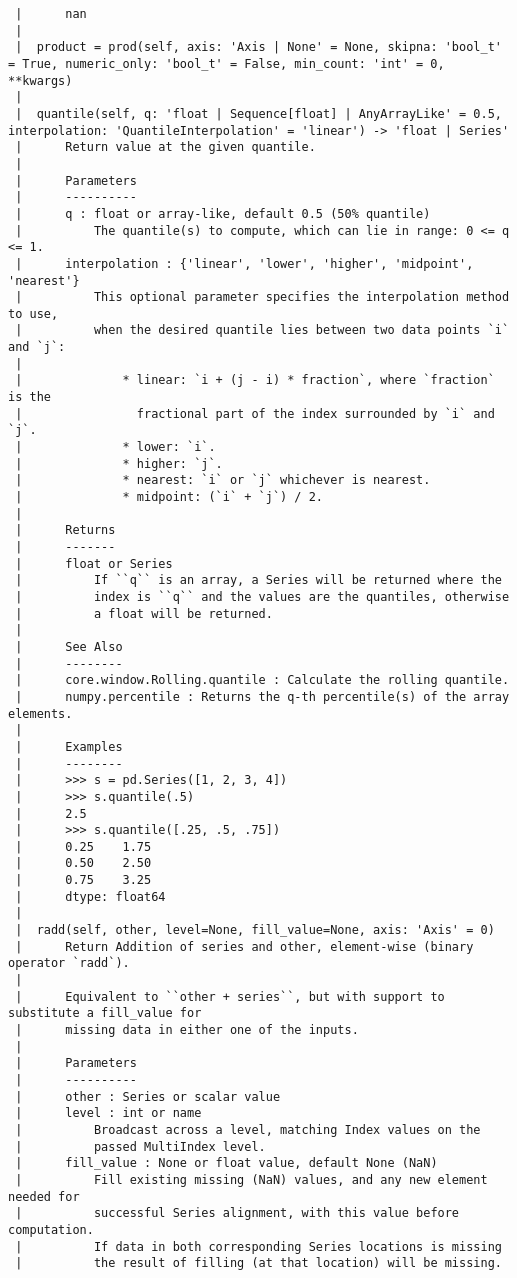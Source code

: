 \documentclass[
  letterpaper,
  DIV=11,
  numbers=noendperiod]{scrreprt}
\begin{document}
\begin{verbatim}
 |      nan
 |  
 |  product = prod(self, axis: 'Axis | None' = None, skipna: 'bool_t' = True, numeric_only: 'bool_t' = False, min_count: 'int' = 0, **kwargs)
 |  
 |  quantile(self, q: 'float | Sequence[float] | AnyArrayLike' = 0.5, interpolation: 'QuantileInterpolation' = 'linear') -> 'float | Series'
 |      Return value at the given quantile.
 |      
 |      Parameters
 |      ----------
 |      q : float or array-like, default 0.5 (50% quantile)
 |          The quantile(s) to compute, which can lie in range: 0 <= q <= 1.
 |      interpolation : {'linear', 'lower', 'higher', 'midpoint', 'nearest'}
 |          This optional parameter specifies the interpolation method to use,
 |          when the desired quantile lies between two data points `i` and `j`:
 |      
 |              * linear: `i + (j - i) * fraction`, where `fraction` is the
 |                fractional part of the index surrounded by `i` and `j`.
 |              * lower: `i`.
 |              * higher: `j`.
 |              * nearest: `i` or `j` whichever is nearest.
 |              * midpoint: (`i` + `j`) / 2.
 |      
 |      Returns
 |      -------
 |      float or Series
 |          If ``q`` is an array, a Series will be returned where the
 |          index is ``q`` and the values are the quantiles, otherwise
 |          a float will be returned.
 |      
 |      See Also
 |      --------
 |      core.window.Rolling.quantile : Calculate the rolling quantile.
 |      numpy.percentile : Returns the q-th percentile(s) of the array elements.
 |      
 |      Examples
 |      --------
 |      >>> s = pd.Series([1, 2, 3, 4])
 |      >>> s.quantile(.5)
 |      2.5
 |      >>> s.quantile([.25, .5, .75])
 |      0.25    1.75
 |      0.50    2.50
 |      0.75    3.25
 |      dtype: float64
 |  
 |  radd(self, other, level=None, fill_value=None, axis: 'Axis' = 0)
 |      Return Addition of series and other, element-wise (binary operator `radd`).
 |      
 |      Equivalent to ``other + series``, but with support to substitute a fill_value for
 |      missing data in either one of the inputs.
 |      
 |      Parameters
 |      ----------
 |      other : Series or scalar value
 |      level : int or name
 |          Broadcast across a level, matching Index values on the
 |          passed MultiIndex level.
 |      fill_value : None or float value, default None (NaN)
 |          Fill existing missing (NaN) values, and any new element needed for
 |          successful Series alignment, with this value before computation.
 |          If data in both corresponding Series locations is missing
 |          the result of filling (at that location) will be missing.

\end{verbatim}
\end{document}
